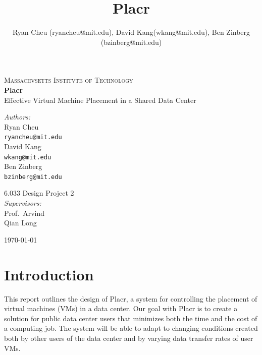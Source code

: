 \documentclass[11pt]{article}
\title{Placr}
\author{Ryan Cheu (ryancheu@mit.edu), David Kang(wkang@mit.edu), Ben Zinberg (bzinberg@mit.edu)}
\begin{document}
\begin{titlepage}

\begin{center}

\textsc{\LARGE Massachvsetts Institvte of Technology}\\[0.5cm]


{ \huge \bfseries Placr \\[0.4cm] }
{\Large Effective Virtual Machine Placement in a Shared Data Center}\\[0.5cm]


\begin{minipage}{0.4\textwidth}
\begin{flushleft} \large
\emph{Authors:}\\[0.5cm]
Ryan Cheu \\
{\tt ryancheu@mit.edu} \\[1cm]
David Kang \\
{\tt wkang@mit.edu} \\[1cm]
Ben Zinberg \\
{\tt bzinberg@mit.edu}
\end{flushleft}
\end{minipage}
\begin{minipage}{0.4\textwidth}
\begin{flushright} \large
6.033 Design Project 2 \\[0.5cm]
  \emph{Supervisors:} \\[0.2cm]
Prof.\ Arvind \\
Qian Long
\end{flushright}
\end{minipage}

\vfill

{\large \today}

\end{center}

\end{titlepage}

\section{Introduction}

This report outlines the design of Placr, a system for controlling the placement of virtual machines (VMs) in a data center.  Our goal with Placr is to create a solution for public data center users that minimizes both the time and the cost of a computing job.  The system will be able to adapt to changing conditions created both by other users of the data center and by varying data transfer rates of user VMs.
\end{document}

